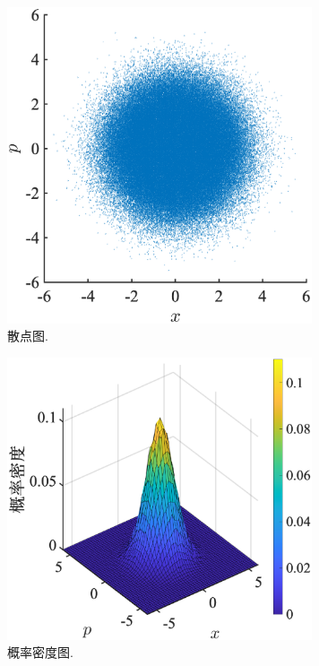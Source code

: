 \documentclass[12pt]{article}
\begin{document}
\begin{figure}[htp]
	\centering
	\includegraphics[width=9cm]{1.eps}
	\caption{散点图.}
	\label{fig:1}
\end{figure}


\begin{figure}[htp]
	\centering
	\includegraphics[width=9cm]{2.eps}
	\caption{概率密度图.}
	\label{fig:2}
\end{figure}
















\end{document}
